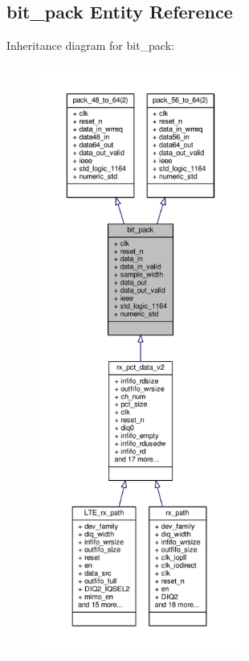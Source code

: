 \subsection{bit\+\_\+pack Entity Reference}
\label{classbit__pack}


Inheritance diagram for bit\+\_\+pack\+:\nopagebreak
\begin{figure}[H]
\begin{center}
\leavevmode
\includegraphics[height=550pt]{d1/d28/classbit__pack__inherit__graph}
\end{center}
\end{figure}


